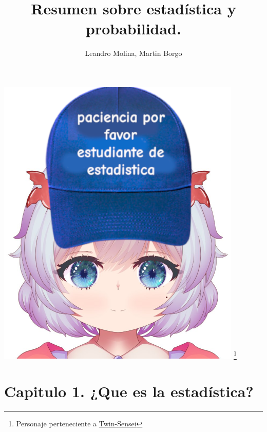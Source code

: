 \documentclass[]{article}
\title{Resumen sobre estadística y probabilidad.}
\author{Leandro Molina, Martin Borgo}
\begin{document}
\maketitle
\vspace{-20pt}

\noindent
\includegraphics[width=\linewidth, height=14cm]{imagenes/twin_estadistica.png}
\footnote{Personaje perteneciente a \href{https://www.youtube.com/@TwinSensei}{Twin-Sensei}}
\pagebreak

\tableofcontents

\pagebreak
\section{Capitulo 1. ¿Que es la estadística?}
\end{document}
